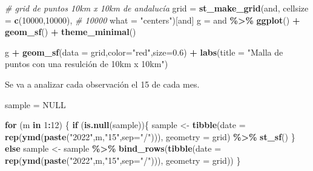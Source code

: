 \documentclass[12pt,a4paper,]{book}
\newenvironment{Shaded}{\begin{snugshade}}{\end{snugshade}}
\newcommand{\AttributeTok}[1]{\textcolor[rgb]{0.13,0.29,0.53}{#1}}
\newcommand{\CommentTok}[1]{\textcolor[rgb]{0.56,0.35,0.01}{\textit{#1}}}
\newcommand{\ConstantTok}[1]{\textcolor[rgb]{0.56,0.35,0.01}{#1}}
\newcommand{\ControlFlowTok}[1]{\textcolor[rgb]{0.13,0.29,0.53}{\textbf{#1}}}
\newcommand{\DecValTok}[1]{\textcolor[rgb]{0.00,0.00,0.81}{#1}}
\newcommand{\FloatTok}[1]{\textcolor[rgb]{0.00,0.00,0.81}{#1}}
\newcommand{\FunctionTok}[1]{\textcolor[rgb]{0.13,0.29,0.53}{\textbf{#1}}}
\newcommand{\NormalTok}[1]{#1}
\newcommand{\OtherTok}[1]{\textcolor[rgb]{0.56,0.35,0.01}{#1}}
\newcommand{\SpecialCharTok}[1]{\textcolor[rgb]{0.81,0.36,0.00}{\textbf{#1}}}
\newcommand{\StringTok}[1]{\textcolor[rgb]{0.31,0.60,0.02}{#1}}
\numberwithin{dummy}{section}
\theoremstyle{ocrenumbox}
\theoremstyle{blacknumex}
\theoremstyle{blacknumbox}
\theoremstyle{ocrenum}
\theoremstyle{ocrenum}
\begin{document}
\begin{Shaded}
\begin{Highlighting}[]
\CommentTok{\# grid de puntos 10km x 10km de andalucía}
\NormalTok{grid }\OtherTok{=} \FunctionTok{st\_make\_grid}\NormalTok{(and,}
                    \AttributeTok{cellsize =} \FunctionTok{c}\NormalTok{(}\DecValTok{10000}\NormalTok{,}\DecValTok{10000}\NormalTok{), }\CommentTok{\# 10000}
                    \AttributeTok{what =} \StringTok{"centers"}\NormalTok{)[and]}
\NormalTok{g }\OtherTok{=}\NormalTok{ and }\SpecialCharTok{\%\textgreater{}\%} 
  \FunctionTok{ggplot}\NormalTok{() }\SpecialCharTok{+}
  \FunctionTok{geom\_sf}\NormalTok{() }\SpecialCharTok{+}
  \FunctionTok{theme\_minimal}\NormalTok{()}
 
\NormalTok{g }\SpecialCharTok{+} 
  \FunctionTok{geom\_sf}\NormalTok{(}\AttributeTok{data =}\NormalTok{ grid,}\AttributeTok{color=}\StringTok{"red"}\NormalTok{,}\AttributeTok{size=}\FloatTok{0.6}\NormalTok{) }\SpecialCharTok{+}
  \FunctionTok{labs}\NormalTok{(}\AttributeTok{title =} \StringTok{"Malla de puntos con una resulción de 10km x 10km"}\NormalTok{)}
\end{Highlighting}
\end{Shaded}

Se va a analizar cada observación el 15 de cada mes.

\begin{Shaded}
\begin{Highlighting}[]
\NormalTok{sample }\OtherTok{=} \ConstantTok{NULL}

\ControlFlowTok{for}\NormalTok{ (m }\ControlFlowTok{in} \DecValTok{1}\SpecialCharTok{:}\DecValTok{12}\NormalTok{) \{}
  \ControlFlowTok{if}\NormalTok{ (}\FunctionTok{is.null}\NormalTok{(sample))\{}
\NormalTok{    sample }\OtherTok{\textless{}{-}} \FunctionTok{tibble}\NormalTok{(}\AttributeTok{date =} \FunctionTok{rep}\NormalTok{(}\FunctionTok{ymd}\NormalTok{(}\FunctionTok{paste}\NormalTok{(}\StringTok{"2022"}\NormalTok{,m,}\StringTok{"15"}\NormalTok{,}\AttributeTok{sep=}\StringTok{"/"}\NormalTok{))),}
                     \AttributeTok{geometry =}\NormalTok{ grid) }\SpecialCharTok{\%\textgreater{}\%} \FunctionTok{st\_sf}\NormalTok{()}
\NormalTok{  \} }\ControlFlowTok{else}
\NormalTok{  sample }\OtherTok{\textless{}{-}}\NormalTok{ sample }\SpecialCharTok{\%\textgreater{}\%} 
    \FunctionTok{bind\_rows}\NormalTok{(}\FunctionTok{tibble}\NormalTok{(}\AttributeTok{date =} \FunctionTok{rep}\NormalTok{(}\FunctionTok{ymd}\NormalTok{(}\FunctionTok{paste}\NormalTok{(}\StringTok{"2022"}\NormalTok{,m,}\StringTok{"15"}\NormalTok{,}\AttributeTok{sep=}\StringTok{"/"}\NormalTok{))),}
                     \AttributeTok{geometry =}\NormalTok{ grid))}
\NormalTok{\}}
\end{Highlighting}
\end{Shaded}
\end{document}
